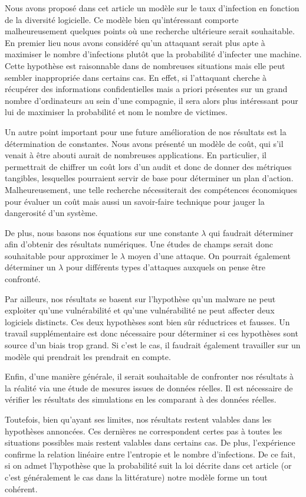 Nous avons proposé dans cet article un modèle sur le taux d'infection en fonction de la diversité logicielle. Ce modèle bien
qu'intéressant comporte malheureusement quelques points où une recherche ultérieure serait souhaitable. En premier lieu nous avons
considéré qu'un attaquant serait plus apte à maximiser le nombre d'infections plutôt que la probabilité d'infecter une machine.
Cette hypothèse est raisonnable dans de nombreuses situations mais elle peut sembler inappropriée dans certains cas. En effet, si
l'attaquant
cherche à récupérer des informations confidentielles mais a priori présentes sur un grand nombre d'ordinateurs au sein d'une
compagnie, il sera alors plus intéressant pour lui de maximiser la probabilité et nom le nombre de victimes.
\newline

Un autre point important pour une future amélioration de nos résultats est la détermination de constantes. Nous avons présenté un
modèle de coût, qui s'il venait à être abouti aurait de nombreuses applications. En particulier, il permettrait de chiffrer un
coût lors d'un audit et donc de donner des métriques tangibles, lesquelles pourraient servir de base pour déterminer un plan
d'action. Malheureusement, une telle recherche nécessiterait des compétences économiques pour évaluer un coût mais aussi un
savoir-faire technique pour jauger la dangerosité d'un système.
\newline

De plus, nous basons nos équations sur une constante $\lambda$ qui faudrait déterminer afin d'obtenir des résultats numériques. Une
études de champs serait donc souhaitable pour approximer le $\lambda$ moyen d'une attaque. On pourrait également déterminer un
$\lambda$ pour différents types d'attaques auxquels on pense être confronté.
\newline

Par ailleurs, nos résultats se basent sur l'hypothèse qu'un malware ne peut exploiter qu'une vulnérabilité et qu'une vulnérabilité
ne peut affecter deux logiciels distincts. Ces deux hypothèses sont bien sûr réductrices et fausses. Un travail supplémentaire est
donc nécessaire pour déterminer si ces hypothèses sont source d'un biais trop grand. Si c'est le cas, il faudrait également
travailler sur un modèle qui prendrait les prendrait en compte.

Enfin, d'une manière générale, il serait souhaitable de confronter nos résultats à la réalité via une étude de mesures issues de
données réelles. Il est nécessaire de vérifier les résultats des simulations en les comparant à des données réelles. 
\newline

Toutefois, bien qu'ayant ses limites, nos résultats restent valables dans les hypothèses annoncées. Ces dernières ne correspondent
certes pas à toutes les situations possibles mais restent valables dans certains cas. De plus, l'expérience confirme la relation
linéaire entre l'entropie et le nombre d'infections. De ce fait, si on admet l'hypothèse que la probabilité suit la loi décrite
dans cet article (or c'est généralement le cas dans la littérature) notre modèle forme un tout cohérent.
